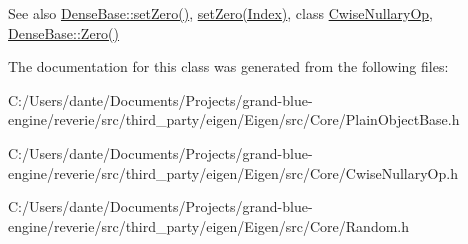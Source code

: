 \begin{DoxySeeAlso}{See also}
\mbox{\hyperlink{class_eigen_1_1_dense_base_ac74411ddeea2545bf20baf14613be47e}{Dense\+Base\+::set\+Zero()}}, \mbox{\hyperlink{class_eigen_1_1_plain_object_base_ac21ad5f989f320e46958b75ac8d9a1da}{set\+Zero(\+Index)}}, class \mbox{\hyperlink{class_eigen_1_1_cwise_nullary_op}{Cwise\+Nullary\+Op}}, \mbox{\hyperlink{class_eigen_1_1_dense_base_a8c4be762b10041d64a2b2ce85bb14ba0}{Dense\+Base\+::\+Zero()}} 
\end{DoxySeeAlso}


The documentation for this class was generated from the following files\+:\begin{DoxyCompactItemize}
\item 
C\+:/\+Users/dante/\+Documents/\+Projects/grand-\/blue-\/engine/reverie/src/third\+\_\+party/eigen/\+Eigen/src/\+Core/Plain\+Object\+Base.\+h\item 
C\+:/\+Users/dante/\+Documents/\+Projects/grand-\/blue-\/engine/reverie/src/third\+\_\+party/eigen/\+Eigen/src/\+Core/Cwise\+Nullary\+Op.\+h\item 
C\+:/\+Users/dante/\+Documents/\+Projects/grand-\/blue-\/engine/reverie/src/third\+\_\+party/eigen/\+Eigen/src/\+Core/Random.\+h\end{DoxyCompactItemize}
